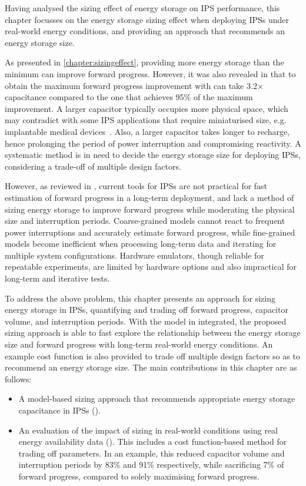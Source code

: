 Having analysed the sizing effect of energy storage on IPS performance, this chapter focusses on the energy storage sizing effect when deploying IPSs under real-world energy conditions, and providing an approach that recommends an energy storage size. 

As presented in \cref{chapter:sizingeffect}, providing more energy storage than the minimum can improve forward progress.
However, it was also revealed in  that to obtain the maximum forward progress improvement with  can take 3.2$\times$ capacitance compared to the one that achieves 95\% of the maximum improvement. 
A larger capacitor typically occupies more physical space, which may contradict with some IPS applications that require miniaturised size, e.g. implantable medical devices~\cite{amar2015power}.
Also, a larger capacitor takes longer to recharge, hence prolonging the period of power interruption and compromising reactivity. 
A systematic method is in need to decide the energy storage size for deploying IPSs, considering a trade-off of multiple design factors. 

However, as reviewed in , current tools for IPSs are not practical for fast estimation of forward progress in a long-term deployment, and lack a method of sizing energy storage to improve forward progress while moderating the physical size and interruption periods. 
Coarse-grained models cannot react to frequent power interruptions and accurately estimate forward progress, while fine-grained models become inefficient when processing long-term data and iterating for multiple system configurations.
Hardware emulators, though reliable for repeatable experiments, are limited by hardware options and also impractical for long-term and iterative tests.

To address the above problem, this chapter presents an approach for sizing energy storage in IPSs, quantifying and trading off forward progress, capacitor volume, and interruption periods. 
With the model in  integrated, the proposed sizing approach is able to fast explore the relationship between the energy storage size and forward progress with long-term real-world energy conditions. 
An example cost function is also provided to trade off multiple design factors so as to recommend an energy storage size. 
The main contributions in this chapter are as follows:
\begin{itemize}
    \item A model-based sizing approach that recommends appropriate energy storage capacitance in IPSs ().
    \item An evaluation of the impact of sizing in real-world conditions using real energy availability data (). 
    This includes a cost function-based method for trading off parameters. 
    In an example, this reduced capacitor volume and interruption periods by 83\% and 91\% respectively, while sacrificing 7\% of forward progress, compared to solely maximising forward progress.
\end{itemize}

